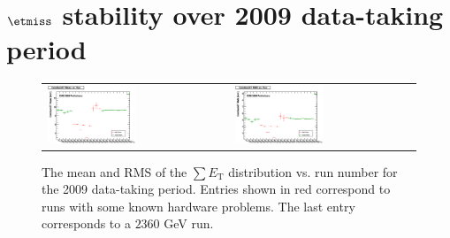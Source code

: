 \section{$\etmiss$ stability over 2009 data-taking period}

\begin{figure}[h!]
 \centering
 \begin{tabular}{ll}
  \includegraphics[width=0.5\textwidth]{plots_METStability/h_caloSumetMean_vs_run.eps} &
  \includegraphics[width=0.5\textwidth]{plots_METStability/h_caloSumetRMS_vs_run.eps} \\
 \end{tabular}
 \caption{\small The mean and RMS of the $\sum E_\text{T}$ distribution vs. run number for the 2009 data-taking period.
          Entries shown in red correspond to runs with some known hardware problems. The last entry corresponds to a $2360$ GeV run.
          \label{fig:SumET_vs_run}}
\end{figure}

